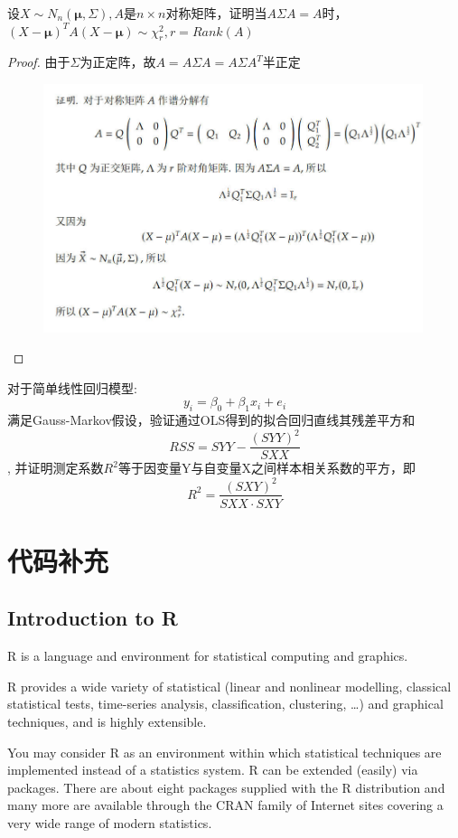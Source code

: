 \documentclass[cn,hazy,green,12pt,normal]{elegantnote}
\numberwithin{equation}{section}
\numberwithin{subsection}{section}
\begin{document}
\begin{homework}
    设$X\sim N_n(\bm \mu, \Sigma),A$是$n\times n$对称矩阵，证明当$A\Sigma A=A$时，$(X-\bm \mu )^TA(X-\bm \mu)\sim \chi_r^2,r=Rank(A)$
\end{homework}
\begin{proof}
    由于$\Sigma$为正定阵，故$A=A\Sigma A=A\Sigma A^T$半正定
    \begin{figure}[!htbp]
        \centering
        \includegraphics[width=30em]{image/ex1_plt2.png}
    \end{figure}
    
\end{proof}
    
\begin{homework}
    对于简单线性回归模型:
    \[y_i=\beta_0+\beta_1x_i+e_i\]满足Gauss-Markov假设，验证通过OLS得到的拟合回归直线其残差平方和
    \[RSS=SYY-\dfrac{(SYY)^2}{SXX}\],
    并证明测定系数$R^2$等于因变量Y与自变量X之间样本相关系数的平方，即
    \[R^2=\dfrac{(SXY)^2}{SXX\cdot SXY}\]
\end{homework}
\section{代码补充}

\subsection{Introduction to R}
R is a language and environment for statistical computing and graphics.

R provides a wide variety of statistical (linear and nonlinear modelling, classical statistical tests,  time-series analysis, classification, clustering, \dots) and graphical techniques, and is highly extensible.

You may consider R as an environment within which statistical techniques are implemented instead of a statistics system. R can be extended (easily) via packages. There are about eight packages supplied with the R distribution and many more are available through the CRAN family of Internet sites covering a very wide range of modern statistics.
\end{document}
